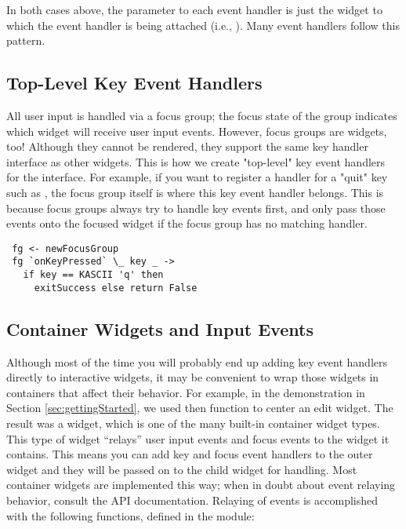 In both cases above, the  parameter to each event handler is
just the widget to which the event handler is being attached (i.e.,
).  Many event handlers follow this pattern.

\subsection{Top-Level Key Event Handlers}

All user input is handled via a focus group; the focus state of the
group indicates which widget will receive user input events.  However,
focus groups are widgets, too!  Although they cannot be rendered, they
support the same key handler interface as other widgets.  This is how
we create "top-level" key event handlers for the interface.  For
example, if you want to register a handler for a "quit" key such as
, the focus group itself is where this key event handler
belongs.  This is because focus groups always try to handle key events
first, and only pass those events onto the focused widget if the focus
group has no matching handler.

\begin{verbatim}
 fg <- newFocusGroup
 fg `onKeyPressed` \_ key _ ->
   if key == KASCII 'q' then
     exitSuccess else return False
\end{verbatim}

\subsection{Container Widgets and Input Events}
\label{sec:containers_and_input}

Although most of the time you will probably end up adding key event
handlers directly to interactive widgets, it may be convenient to wrap
those widgets in containers that affect their behavior.  For example,
in the demonstration in Section \ref{sec:gettingStarted}, we used then
 function to center an edit widget.  The result was a
 widget, which is one of the many built-in container
widget types.  This type of widget ``relays'' user input events and
focus events to the widget it contains.  This means you can add key
and focus event handlers to the outer widget and they will be passed
on to the child widget for handling.  Most container widgets are
implemented this way; when in doubt about event relaying behavior,
consult the API documentation.  Relaying of events is accomplished
with the following functions, defined in the  module:

